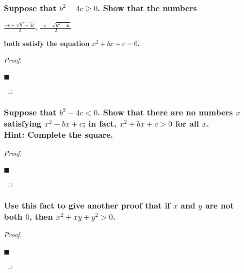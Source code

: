 \documentclass[letterpaper, 10 pt, conference]{ieeeconf}  %
\begin{document}
\begin{mdframed}
\subsubsection{\textbf{Suppose that $b^2 - 4c \geq 0$. Show that the numbers}}

\begin{center}
    $\frac{-b + \sqrt{b^2 - 4c}}{2}$, \tab $\frac{-b - \sqrt{b^2 - 4c}}{2}$
\end{center}

\textbf{both satisfy the equation $x^2 +bx +c = 0$.}
\end{mdframed}

\begin{proof}
\begin{align}
    
\end{align}
\begin{flushright}
$\blacksquare$
\end{flushright}
\end{proof}


\begin{mdframed}
\subsubsection{\textbf{Suppose that $b^2 - 4c < 0$. Show that there are no numbers $x$ satisfying $x^2 + bx + c$; in fact, $x^2 + bx + c > 0$ for all $x$. \\ Hint: Complete the square.}}
\end{mdframed}

\begin{proof}
\begin{align}
    
\end{align}
\begin{flushright}
$\blacksquare$
\end{flushright}
\end{proof}

\begin{mdframed}
\subsubsection{\textbf{Use this fact to give another proof that if $x$ and $y$ are not both $0$, then $x^2 + xy + y^2 > 0$.}}
\end{mdframed}

\begin{proof}
\begin{align}
    
\end{align}
\begin{flushright}
$\blacksquare$
\end{flushright}
\end{proof}
\end{document}
